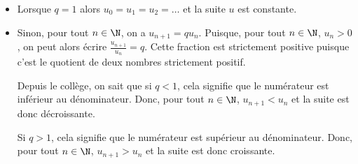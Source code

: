 \documentclass[10pt,openright,twoside,french]{book}
\begin{document}
\begin{Demo}
    \begin{itemize}
        \item Lorsque $q = 1$ alors $u_0 = u_1 = u_2 =\ldots$ et la suite $u$ est constante.
        \item Sinon, pour tout $n \in \N$, on a $u_{n+1} = qu_n$. Puisque, pour tout $n \in \N$, $u_n > 0$, on peut alors écrire $\frac{u_{n+1}}{u_n} = q$. Cette fraction est strictement positive puisque c'est le quotient de deux nombres strictement positif.\par
            Depuis le collège, on sait que si $q<1$, cela signifie que le numérateur est inférieur au dénominateur. Donc, pour tout $n \in \N$, $u_{n+1} < u_n$ et la suite est donc décroissante.\par
            Si $q > 1$, cela signifie que le numérateur est supérieur au dénominateur. Donc, pour tout $n \in \N$, $u_{n+1} > u_n$ et la suite est donc croissante.
    \end{itemize}
\end{Demo}
\end{document}
